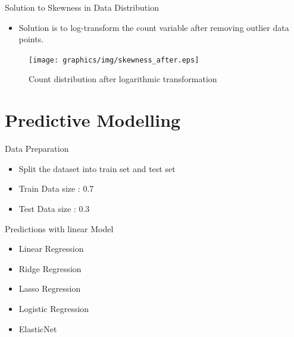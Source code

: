 \documentclass[
 size=14pt,
 paper=smartboard,  %
 mode=present, 		%
 display=slides, 	%
 style=tuliplab,  	%
 pauseslide,
 fleqn,leqno]{powerdot}
\begin{document}
  \begin{slide}[toc=,bm=]{ Solution to Skewness in Data Distribution}

    \begin{itemize}
    \item Solution is to log-transform the count variable after removing outlier data points.
    \end{itemize}
    \begin{figure}
      \centering
      \centerline{\texttt{[image: graphics/img/skewness\_after.eps]}}
      \caption{Count distribution after logarithmic transformation}\label{fig:Count distribution after logarithmic transformation}
    \end{figure}
    \end{slide}

    
\section{Predictive Modelling}


\begin{slide}[toc=,bm=]{Data Preparation}
  
  \begin{itemize}
  \item Split the dataset into train set and test set
  \item Train Data size : 0.7
  \item Test Data size : 0.3
  
  \end{itemize}
  
  \end{slide}
  

\begin{slide}[toc=,bm=]{Predictions with linear Model}
\begin{itemize}
\item Linear Regression
\item Ridge Regression
\item Lasso Regression
\item Logistic Regression
\item ElasticNet

\end{itemize}

\end{slide}
\end{document}
